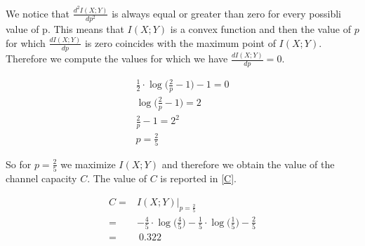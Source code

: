 We notice that $\frac{d^2I(X;Y)}{dp^2}$ is always equal or greater than zero for every possibli value of p. This means that $I(X;Y)$ is a convex function and then the value of $p$ for which $\frac{dI(X;Y)}{dp}$ is zero coincides with the maximum point of $I(X;Y)$. Therefore we compute the values for which we have $\frac{dI(X;Y)}{dp}=0$.

\begin{equation}
\begin{gathered}
	\frac{1}{2} \cdot \log \Big ( \frac{2}{p} - 1\Big)-1 = 0 \\
	\log \Big ( \frac{2}{p} - 1\Big) = 2 \\
	\frac{2}{p} - 1 = 2^2 \\
	p = \frac{2}{5}
\end{gathered}
\end{equation}

So for $p=\frac{2}{5}$ we maximize $I(X;Y)$ and therefore we obtain the value of the channel capacity $C$. The value of $C$ is reported in \eqref{C}.

\begin{equation}
\begin{aligned}
	C = & I(X;Y)|_{p=\frac{2}{5}} \\ = &-\frac{4}{5} \cdot \log\Big (\frac{4}{5}\Big)- \frac{1}{5}\cdot\log \Big(\frac{1}{5}\Big)-\frac{2}{5} \\
	= & \ 0.322
	\label{C}
\end{aligned}
\end{equation}
